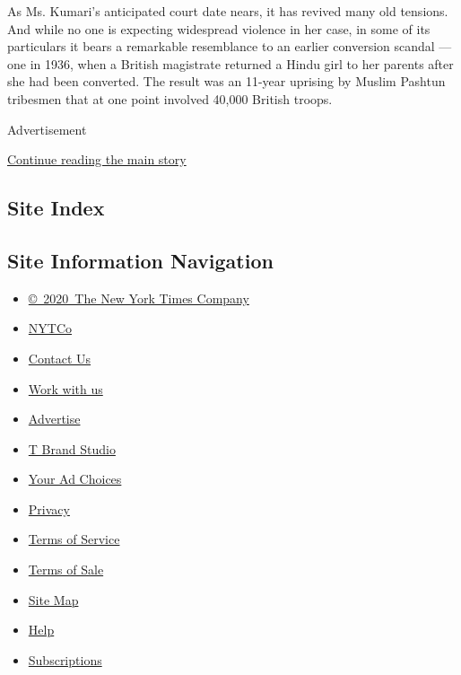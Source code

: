 As Ms. Kumari's anticipated court date nears, it has revived many old
tensions. And while no one is expecting widespread violence in her case,
in some of its particulars it bears a remarkable resemblance to an
earlier conversion scandal --- one in 1936, when a British magistrate
returned a Hindu girl to her parents after she had been converted. The
result was an 11-year uprising by Muslim Pashtun tribesmen that at one
point involved 40,000 British troops.

Advertisement

\protect\hyperlink{after-bottom}{Continue reading the main story}

\hypertarget{site-index}{%
\subsection{Site Index}\label{site-index}}

\hypertarget{site-information-navigation}{%
\subsection{Site Information
Navigation}\label{site-information-navigation}}

\begin{itemize}
\tightlist
\item
  \href{https://help.nytimes.com/hc/en-us/articles/115014792127-Copyright-notice}{©~2020~The
  New York Times Company}
\end{itemize}

\begin{itemize}
\tightlist
\item
  \href{https://www.nytco.com/}{NYTCo}
\item
  \href{https://help.nytimes.com/hc/en-us/articles/115015385887-Contact-Us}{Contact
  Us}
\item
  \href{https://www.nytco.com/careers/}{Work with us}
\item
  \href{https://nytmediakit.com/}{Advertise}
\item
  \href{http://www.tbrandstudio.com/}{T Brand Studio}
\item
  \href{https://www.nytimes.com/privacy/cookie-policy\#how-do-i-manage-trackers}{Your
  Ad Choices}
\item
  \href{https://www.nytimes.com/privacy}{Privacy}
\item
  \href{https://help.nytimes.com/hc/en-us/articles/115014893428-Terms-of-service}{Terms
  of Service}
\item
  \href{https://help.nytimes.com/hc/en-us/articles/115014893968-Terms-of-sale}{Terms
  of Sale}
\item
  \href{https://spiderbites.nytimes.com}{Site Map}
\item
  \href{https://help.nytimes.com/hc/en-us}{Help}
\item
  \href{https://www.nytimes.com/subscription?campaignId=37WXW}{Subscriptions}
\end{itemize}

